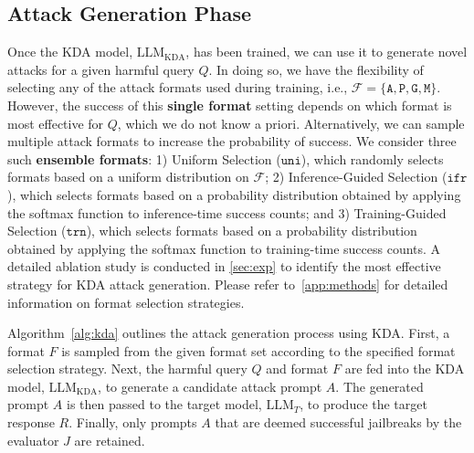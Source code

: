 \subsection{Attack Generation Phase}\label{sec:KDA_infer} 
Once the KDA model, $\text{LLM}_{\text{KDA}}$, has been trained, we can use it to generate novel attacks for a given harmful query $Q$. In doing so, we have the flexibility of selecting any of the attack formats used during training, i.e., $\mathcal{F}=\{\texttt{A},\texttt{P},\texttt{G}, \texttt{M}\}$. However, the success of this \textbf{single format} setting depends on which format is most effective for $Q$, which we do not know a priori. Alternatively, we can sample multiple attack formats to increase the probability of success. We consider three such \textbf{ensemble formats}: 1) Uniform Selection ($\texttt{uni}$), which randomly selects formats based on a uniform distribution on $\mathcal{F}$; 2) Inference-Guided Selection ($\texttt{ifr}$), which selects formats based on a probability distribution obtained by applying the softmax function to inference-time success counts; and 3) Training-Guided Selection ($\texttt{trn}$), which selects formats based on a probability distribution obtained by applying the softmax function to training-time success counts. A detailed ablation study is conducted in \autoref{sec:exp} to identify the most effective strategy for KDA attack generation. Please refer to~\autoref{app:methods} for detailed information on format selection strategies.


Algorithm~\ref{alg:kda} outlines the attack generation process using KDA. First, a format $F$ is sampled from the given format set according to the specified format selection strategy. Next, the harmful query $Q$ and format $F$ are fed into the KDA model, $\text{LLM}_{\text{KDA}}$, to generate a candidate attack prompt $A$. The generated prompt $A$ is then passed to the target model, $\text{LLM}_T$, to produce the target response $R$. Finally, only prompts $A$ that are deemed successful jailbreaks by the evaluator $J$ are retained.






